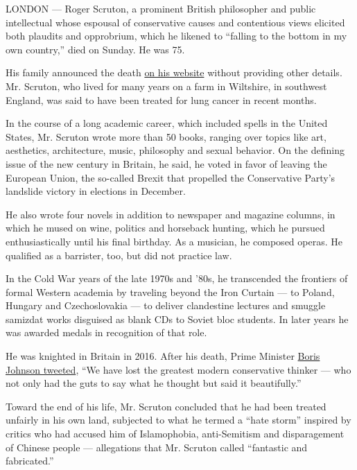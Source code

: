 LONDON --- Roger Scruton, a prominent British philosopher and public
intellectual whose espousal of conservative causes and contentious views
elicited both plaudits and opprobrium, which he likened to ``falling to
the bottom in my own country,'' died on Sunday. He was 75.

His family announced the death \href{https://www.roger-scruton.com/}{on
his website} without providing other details. Mr. Scruton, who lived for
many years on a farm in Wiltshire, in southwest England, was said to
have been treated for lung cancer in recent months.

In the course of a long academic career, which included spells in the
United States, Mr. Scruton wrote more than 50 books, ranging over topics
like art, aesthetics, architecture, music, philosophy and sexual
behavior. On the defining issue of the new century in Britain, he said,
he voted in favor of leaving the European Union, the so-called Brexit
that propelled the Conservative Party's landslide victory in elections
in December.

He also wrote four novels in addition to newspaper and magazine columns,
in which he mused on wine, politics and horseback hunting, which he
pursued enthusiastically until his final birthday. As a musician, he
composed operas. He qualified as a barrister, too, but did not practice
law.

In the Cold War years of the late 1970s and '80s, he transcended the
frontiers of formal Western academia by traveling beyond the Iron
Curtain --- to Poland, Hungary and Czechoslovakia --- to deliver
clandestine lectures and smuggle samizdat works disguised as blank CDs
to Soviet bloc students. In later years he was awarded medals in
recognition of that role.

He was knighted in Britain in 2016. After his death, Prime Minister
\href{https://twitter.com/BorisJohnson/status/1216674269721219072?ref_src=twsrc\%5Etfw\%7Ctwcamp\%5Etweetembed\%7Ctwterm\%5E1216674269721219072\&ref_url=https\%3A\%2F\%2Fwww.bbc.com\%2Fnews\%2Fuk-51084248}{Boris
Johnson tweeted}, ``We have lost the greatest modern conservative
thinker --- who not only had the guts to say what he thought but said it
beautifully.''

Toward the end of his life, Mr. Scruton concluded that he had been
treated unfairly in his own land, subjected to what he termed a ``hate
storm'' inspired by critics who had accused him of Islamophobia,
anti-Semitism and disparagement of Chinese people --- allegations that
Mr. Scruton called ``fantastic and fabricated.''

